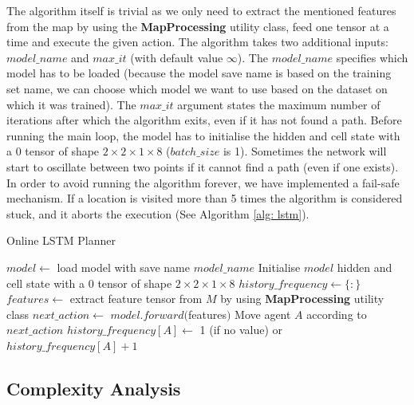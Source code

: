 The algorithm itself is trivial as we only need to extract the mentioned features from the map by using the \textbf{MapProcessing} utility class, feed one tensor at a time and execute the given action. The algorithm takes two additional inputs: $model\_name$ and $max\_it$ (with default value $\infty$). The $model\_name$ specifies which model has to be loaded (because the model save name is based on the training set name, we can choose which model we want to use based on the dataset on which it was trained). The $max\_it$ argument states the maximum number of iterations after which the algorithm exits, even if it has not found a path. Before running the main loop, the model has to initialise the hidden and cell state with a 0 tensor of shape $2 \times 2 \times 1 \times 8$ ($batch\_size$ is 1). Sometimes the network will start to oscillate between two points if it cannot find a path (even if one exists). In order to avoid running the algorithm forever, we have implemented a fail-safe mechanism. If a location is visited more than 5 times the algorithm is considered stuck, and it aborts the execution (See Algorithm \ref{alg: lstm}).


\begin{algorithm}[h!]
\caption{Online LSTM Planner}
\label{alg: lstm}
\begin{algorithmic}[1]
    \State $model \gets $ load model with save name $model\_name$
    \State Initialise $model$ hidden and cell state with a 0 tensor of shape $2 \times 2 \times 1 \times 8$
    \State $history\_frequency \gets \{\colon\}$
    \State
    \For {$i$ in [0, $max\_it$)}
            \State \Return
        \EndIf
        \State $features \gets$ extract feature tensor from $M$ by using \textbf{MapProcessing} utility class
        \State $next\_action \gets$ $model.forward($features$)$
            \State Move agent $A$ according to $next\_action$
        \EndIf
        \State
        \State $history\_frequency[A] \gets$ 1 (if no value) or $history\_frequency[A] + 1$
            \State \Return
        \EndIf
    \EndFor
\EndProcedure
\end{algorithmic}
\end{algorithm}

\subsection{Complexity Analysis}

